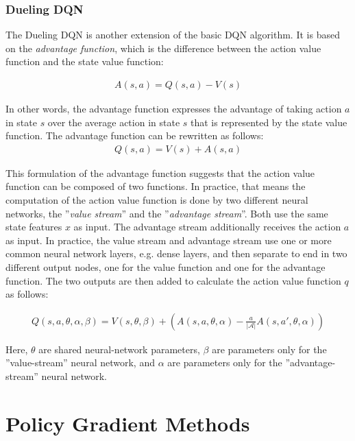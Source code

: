 \subsubsection*{Dueling DQN}

The Dueling DQN is another extension of the basic DQN algorithm. It is based on the \emph{advantage function}, which is the difference between the action value function and the state value function:


\begin{align*}
A(s, a) = Q(s, a) - V(s)
\end{align*}

In other words, the advantage function expresses the advantage of taking action $a$ in state $s$ over the average action in state $s$ that is represented by the state value function. The advantage function can be rewritten as follows:
\begin{align*}
Q(s, a) = V(s) + A(s, a)
\end{align*}

This formulation of the advantage function suggests that the action value function can be composed of two functions. In practice, that means the computation of the action value function is done by two different neural networks, the ''\emph{value stream}'' and the ''\emph{advantage stream}''. Both use the same state features $x$ as input. The advantage stream additionally receives the action $a$ as input. In practice, the value stream and advantage stream use one or more common neural network layers, e.g. dense layers, and then separate to end in two different output nodes, one for the value function and one for the advantage function. The two outputs are then added to calculate the action value function $q$ as follows:

\begin{align*}
Q(s, a, \theta, \alpha, \beta) = V(s, \theta, \beta) + \left( A(s, a, \theta, \alpha) - \frac{a}{|\mathcal{A}|} A(s, a', \theta, \alpha) \right)
\end{align*}

Here, $\theta$ are shared neural-network parameters, $\beta$ are parameters only for the ''value-stream'' neural network, and $\alpha$ are parameters only for the ''advantage-stream'' neural network.

\section{Policy Gradient Methods}

